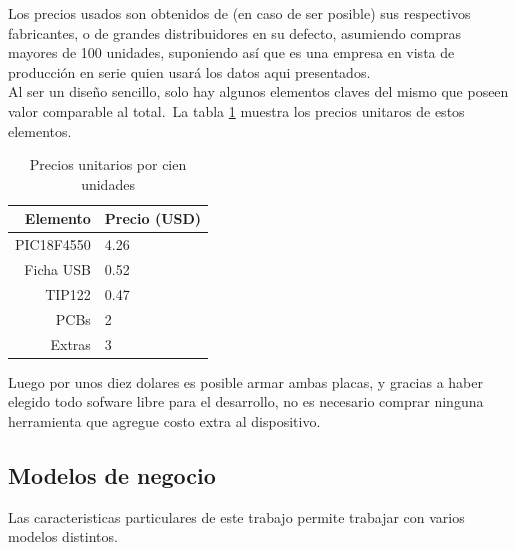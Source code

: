 Los precios usados son obtenidos de (en caso de ser posible) sus respectivos
fabricantes, o de grandes distribuidores en su defecto, asumiendo compras
mayores de 100 unidades, suponiendo as\'i que es una empresa en vista de
producci\'on en serie quien usar\'a los datos aqui presentados.\\






Al ser un dise\~no sencillo, solo hay algunos elementos claves del mismo que
poseen valor comparable al total.\ 
La tabla \ref{tab:element_cost} muestra los precios unitaros de estos
elementos.


\begin{table}[ht]
\centering
\begin{tabular}{r|l}
Elemento    & Precio (USD) 	\\ \hline
PIC18F4550  & 4.26			\\
Ficha USB   & 0.52			\\
TIP122      & 0.47			\\
PCBs        & 2				\\
Extras		& 3				\\
\end{tabular}
\caption{Precios unitarios por cien unidades} 
\label{tab:element_cost}
\end{table}


Luego por unos diez dolares es posible armar ambas placas, y gracias a haber
elegido todo sofware libre para el desarrollo, no es necesario comprar ninguna
herramienta que agregue costo extra al dispositivo.\\

\subsection{Modelos de negocio}

Las caracteristicas particulares de este trabajo permite trabajar con varios
modelos distintos.\\

